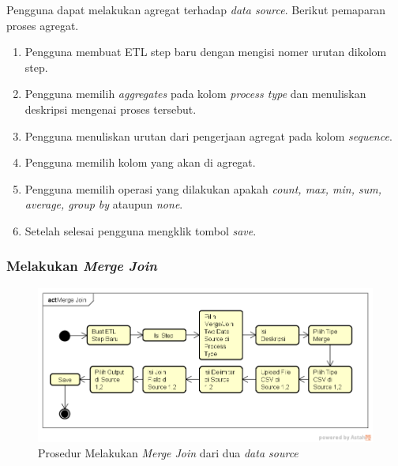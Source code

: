 	Pengguna dapat melakukan agregat terhadap \textit{data source}. Berikut pemaparan proses agregat.
	\begin{enumerate}
		\item Pengguna membuat ETL step baru dengan mengisi nomer urutan dikolom step.
		\item Pengguna memilih \textit{aggregates} pada kolom \textit{process type} dan menuliskan deskripsi mengenai proses tersebut.
		\item Pengguna menuliskan urutan dari pengerjaan agregat pada kolom \textit{sequence}.
		\item Pengguna memilih kolom yang akan di agregat.
		\item Pengguna memilih operasi yang dilakukan apakah \textit{count, max, min, sum, average, group by} ataupun \textit{none}.
		\item Setelah selesai pengguna mengklik tombol \textit{save}.
	\end{enumerate}
	
\subsubsection{Melakukan \textit{Merge Join}}

	\begin{figure}[H]
	\centering
	\includegraphics[scale=0.5]{Gambar/Merge-Join}
	\caption{Prosedur Melakukan \textit{Merge Join} dari dua \textit{data source}}
	\end{figure}

